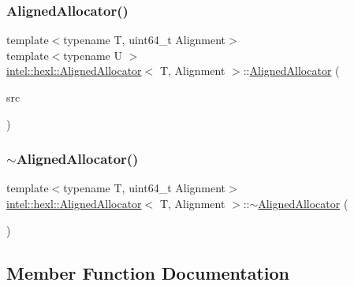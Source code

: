 \subsubsection{\texorpdfstring{Aligned\+Allocator()}{AlignedAllocator()}\hspace{0.1cm}{\footnotesize\ttfamily [3/3]}}
{\footnotesize\ttfamily template$<$typename T, uint64\+\_\+t Alignment$>$ \\
template$<$typename U $>$ \\
\hyperlink{classintel_1_1hexl_1_1AlignedAllocator}{intel\+::hexl\+::\+Aligned\+Allocator}$<$ T, Alignment $>$\+::\hyperlink{classintel_1_1hexl_1_1AlignedAllocator}{Aligned\+Allocator} (\begin{DoxyParamCaption}\item[{const \hyperlink{classintel_1_1hexl_1_1AlignedAllocator}{Aligned\+Allocator}$<$ U, Alignment $>$ \&}]{src }\end{DoxyParamCaption})\hspace{0.3cm}{\ttfamily [inline]}}

\mbox{\label{classintel_1_1hexl_1_1AlignedAllocator_a6841e8cef5bedf494f47370062c73cbc}} 
\subsubsection{\texorpdfstring{$\sim$\+Aligned\+Allocator()}{~AlignedAllocator()}}
{\footnotesize\ttfamily template$<$typename T, uint64\+\_\+t Alignment$>$ \\
\hyperlink{classintel_1_1hexl_1_1AlignedAllocator}{intel\+::hexl\+::\+Aligned\+Allocator}$<$ T, Alignment $>$\+::$\sim$\hyperlink{classintel_1_1hexl_1_1AlignedAllocator}{Aligned\+Allocator} (\begin{DoxyParamCaption}{ }\end{DoxyParamCaption})\hspace{0.3cm}{\ttfamily [inline]}}



\subsection{Member Function Documentation}
\mbox{\label{classintel_1_1hexl_1_1AlignedAllocator_ac007b85746672b4e777aa9561b54f8a9}} 
